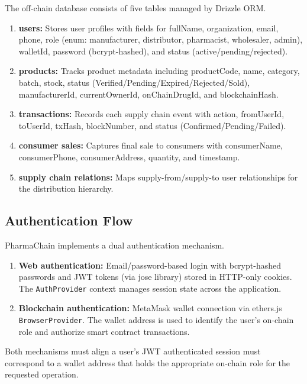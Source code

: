 \documentclass[conference]{IEEEtran}
\begin{document}
The off-chain database consists of five tables managed by Drizzle ORM.



\begin{enumerate}
\item \textbf{users:} Stores user profiles with fields for fullName, organization, email, phone, role (enum: manufacturer, distributor, pharmacist, wholesaler, admin), walletId, password (bcrypt-hashed), and status (active/pending/rejected).
\item \textbf{products:} Tracks product metadata including productCode, name, category, batch, stock, status (Verified/Pending/Expired/Rejected/Sold), manufacturerId, currentOwnerId, onChainDrugId, and blockchainHash.
\item \textbf{transactions:} Records each supply chain event with action, fromUserId, toUserId, txHash, blockNumber, and status (Confirmed/Pending/Failed).
\item \textbf{consumer sales:} Captures final sale to consumers with consumerName, consumerPhone, consumerAddress, quantity, and timestamp.
\item \textbf{supply chain relations:} Maps supply-from/supply-to user relationships for the distribution hierarchy.
\end{enumerate}

\subsection{Authentication Flow}

PharmaChain implements a dual authentication mechanism.




\begin{enumerate}
\item \textbf{Web authentication:} Email/password-based login with bcrypt-hashed passwords and JWT tokens (via jose library) stored in HTTP-only cookies. The \texttt{AuthProvider} context manages session state across the application.
\item \textbf{Blockchain authentication:} MetaMask wallet connection via ethers.js \texttt{BrowserProvider}. The wallet address is used to identify the user's on-chain role and authorize smart contract transactions.
\end{enumerate}

Both mechanisms must align a user's JWT authenticated session must correspond to a wallet address that holds the appropriate on-chain role for the requested operation.
\end{document}
